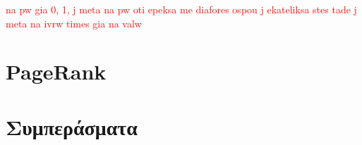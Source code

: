 \documentclass[12pt]{article}
\begin{document}
	\textcolor{red}{na pw  gia 0, 1, j meta na pw oti epeksa me diafores ospou j ekateliksa stes tade j meta na ivrw times gia na valw}
	
	\label{chap:community_structure_(modularity)_12}
	
	
	
	\newpage
	\section{PageRank}
	\label{chap:PageRank_13}
	
	
	
	\newpage
	\section{Συμπεράσματα}
	\label{chap:simperasmata_14}	
\end{document}
